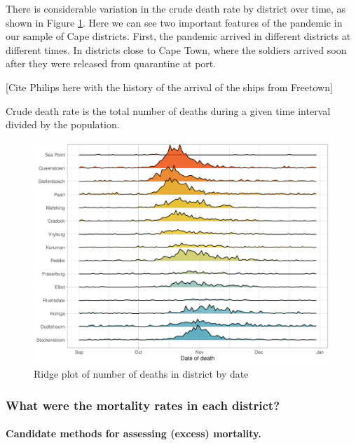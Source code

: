 \documentclass[fleqn,10pt,lineno]{wlpeerj} %
\begin{document}
There is considerable variation in the crude death rate by district over time, as shown in Figure \ref{fig:town-density}. Here we can see two important features of the pandemic in our sample of Cape districts. First, the pandemic arrived in different districts at different times. In districts close to Cape Town, where the soldiers arrived soon after they were released from quarantine at port.

{[}Cite Philips here with the history of the arrival of the ships from Freetown{]}

Crude death rate is the total number of deaths during a given time interval divided by the population.

\begin{figure}
\centering
\includegraphics{spanish-flu-mortality_bookdown_files/figure-latex/town-density-1.pdf}
\caption{\label{fig:town-density}Ridge plot of number of deaths in district by date}
\end{figure}

\hypertarget{what-were-the-mortality-rates-in-each-district}{%
\subsubsection{What were the mortality rates in each district?}\label{what-were-the-mortality-rates-in-each-district}}

\hypertarget{candidate-methods-for-assessing-excess-mortality.}{%
\paragraph{Candidate methods for assessing (excess) mortality.}\label{candidate-methods-for-assessing-excess-mortality.}}
\end{document}
